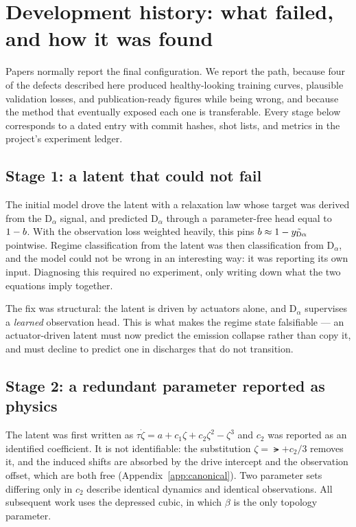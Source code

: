 
\section{Development history: what failed, and how it was found}
\label{app:history}

Papers normally report the final configuration. We report the path, because
four of the defects described here produced healthy-looking training curves,
plausible validation losses, and publication-ready figures while being
wrong, and because the method that eventually exposed each one is
transferable. Every stage below corresponds to a dated entry with commit
hashes, shot lists, and metrics in the project's experiment ledger.

\subsection{Stage 1: a latent that could not fail}
\label{app:hist-proxy}

The initial model drove the latent with a relaxation law whose target was
derived from the D$_\alpha$ signal, and predicted D$_\alpha$ through a
parameter-free head equal to $1 - b$. With the observation loss weighted
heavily, this pins $b \approx 1 - \tilde{y_{\mathrm{D}\alpha}}$ pointwise. Regime
classification from the latent was then classification from D$_\alpha$, and
the model could not be wrong in an interesting way: it was reporting its own
input. Diagnosing this required no experiment, only writing down what the
two equations imply together.

The fix was structural: the latent is driven by actuators alone, and
D$_\alpha$ supervises a \emph{learned} observation head. This is what makes
the regime state falsifiable --- an actuator-driven latent must now predict
the emission collapse rather than copy it, and must decline to predict one
in discharges that do not transition.

\subsection{Stage 2: a redundant parameter reported as physics}
\label{app:hist-cubic}

The latent was first written as
$\tau\dot\zeta = a + c_1\zeta + c_2\zeta^2 - \zeta^3$ and $c_2$ was reported
as an identified coefficient. It is not identifiable: the substitution
$\zeta = \lat + c_2/3$ removes it, and the induced shifts are absorbed by
the drive intercept and the observation offset, which are both free
(Appendix~\ref{app:canonical}). Two parameter sets differing only in $c_2$
describe identical dynamics and identical observations. All subsequent work
uses the depressed cubic, in which $\beta$ is the only topology parameter.

